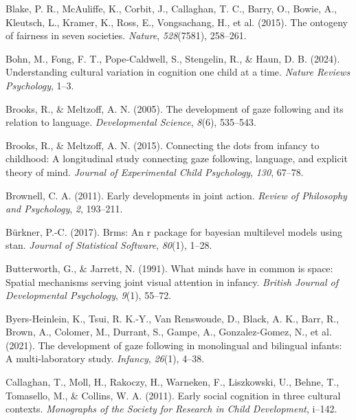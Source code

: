 \documentclass[
  man,floatsintext]{apa7}
\newlength{\cslhangindent}
\newenvironment{CSLReferences}[2] %
 {\begin{list}{}{%
  \setlength{\itemindent}{0pt}
  \setlength{\leftmargin}{0pt}
  \setlength{\parsep}{0pt}
  \ifodd #1
   \setlength{\leftmargin}{\cslhangindent}
   \setlength{\itemindent}{-1\cslhangindent}
  \fi
  \setlength{\itemsep}{#2\baselineskip}}}
 {\end{list}}
\begin{document}
\begin{CSLReferences}{1}{0}
Blake, P. R., McAuliffe, K., Corbit, J., Callaghan, T. C., Barry, O., Bowie, A., Kleutsch, L., Kramer, K., Ross, E., Vongsachang, H., et al. (2015). The ontogeny of fairness in seven societies. \emph{Nature}, \emph{528}(7581), 258--261.

Bohn, M., Fong, F. T., Pope-Caldwell, S., Stengelin, R., \& Haun, D. B. (2024). Understanding cultural variation in cognition one child at a time. \emph{Nature Reviews Psychology}, 1--3.

Brooks, R., \& Meltzoff, A. N. (2005). The development of gaze following and its relation to language. \emph{Developmental Science}, \emph{8}(6), 535--543.

Brooks, R., \& Meltzoff, A. N. (2015). Connecting the dots from infancy to childhood: A longitudinal study connecting gaze following, language, and explicit theory of mind. \emph{Journal of Experimental Child Psychology}, \emph{130}, 67--78.

Brownell, C. A. (2011). Early developments in joint action. \emph{Review of Philosophy and Psychology}, \emph{2}, 193--211.

Bürkner, P.-C. (2017). Brms: An r package for bayesian multilevel models using stan. \emph{Journal of Statistical Software}, \emph{80}(1), 1--28.

Butterworth, G., \& Jarrett, N. (1991). What minds have in common is space: Spatial mechanisms serving joint visual attention in infancy. \emph{British Journal of Developmental Psychology}, \emph{9}(1), 55--72.

Byers-Heinlein, K., Tsui, R. K.-Y., Van Renswoude, D., Black, A. K., Barr, R., Brown, A., Colomer, M., Durrant, S., Gampe, A., Gonzalez-Gomez, N., et al. (2021). The development of gaze following in monolingual and bilingual infants: A multi-laboratory study. \emph{Infancy}, \emph{26}(1), 4--38.

Callaghan, T., Moll, H., Rakoczy, H., Warneken, F., Liszkowski, U., Behne, T., Tomasello, M., \& Collins, W. A. (2011). Early social cognition in three cultural contexts. \emph{Monographs of the Society for Research in Child Development}, i--142.


\end{CSLReferences}
\end{document}
